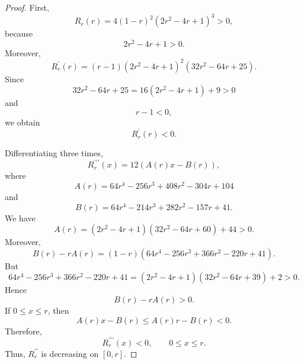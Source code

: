\documentclass[11pt,a4paper]{article}
\numberwithin{equation}{section}
\numberwithin{table}{section}
\theoremstyle{plain}
\theoremstyle{definition}\newtheorem{definition}[theorem]{Definition}
\theoremstyle{remark}\newtheorem{remark}[theorem]{Remark}
\begin{document}
\begin{proof}
First, 
\begin{equation*}
R_r(r)=4(1-r)^2(2r^2-4r+1)^3>0,
\end{equation*}
because 
\begin{equation*}
2r^2-4r+1>0.
\end{equation*}
Moreover, 
\begin{equation*}
R_r^{\prime}(r)=(r-1)(2r^2-4r+1)^2(32r^2-64r+25).
\end{equation*}
Since 
\begin{equation*}
32r^2-64r+25=16(2r^2-4r+1)+9>0
\end{equation*}
and 
\begin{equation*}
r-1<0,
\end{equation*}
we obtain 
\begin{equation*}
R_r^{\prime}(r)<0.
\end{equation*}

Differentiating three times, 
\begin{equation*}
R_r^{\prime\prime\prime}(x)=12(A(r)x-B(r)),
\end{equation*}
where 
\begin{equation*}
A(r)=64r^4-256r^3+408r^2-304r+104
\end{equation*}
and 
\begin{equation*}
B(r)=64r^4-214r^3+282r^2-157r+41.
\end{equation*}
We have 
\begin{equation*}
A(r)=(2r^2-4r+1)(32r^2-64r+60)+44>0.
\end{equation*}
Moreover, 
\begin{equation*}
B(r)-rA(r)=(1-r)(64r^4-256r^3+366r^2-220r+41).
\end{equation*}
But 
\begin{equation*}
64r^4-256r^3+366r^2-220r+41=(2r^2-4r+1)(32r^2-64r+39)+2>0.
\end{equation*}
Hence 
\begin{equation*}
B(r)-rA(r)>0.
\end{equation*}
If $0\leq x\leq r$, then 
\begin{equation*}
A(r)x-B(r)\leq A(r)r-B(r)<0.
\end{equation*}
Therefore, 
\begin{equation*}
R_r^{\prime\prime\prime}(x)<0, \qquad 0\leq x\leq r.
\end{equation*}
Thus, $R_r^{\prime\prime}$ is decreasing on $[0,r]$.


\end{proof}
\end{document}
